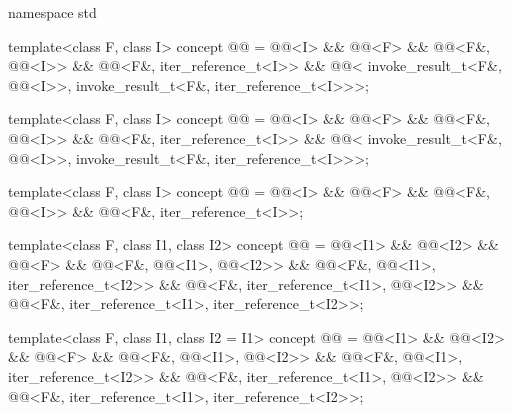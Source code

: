 \begin{codeblock}
namespace std {
  template<class F, class I>
    concept @@ =
      @@<I> &&
      @@<F> &&
      @@<F&, @@<I>> &&
      @@<F&, iter_reference_t<I>> &&
      @@<
        invoke_result_t<F&, @@<I>>,
        invoke_result_t<F&, iter_reference_t<I>>>;

  template<class F, class I>
    concept @@ =
      @@<I> &&
      @@<F> &&
      @@<F&, @@<I>> &&
      @@<F&, iter_reference_t<I>> &&
      @@<
        invoke_result_t<F&, @@<I>>,
        invoke_result_t<F&, iter_reference_t<I>>>;

  template<class F, class I>
    concept @@ =
      @@<I> &&
      @@<F> &&
      @@<F&, @@<I>> &&
      @@<F&, iter_reference_t<I>>;

  template<class F, class I1, class I2>
    concept @@ =
      @@<I1> && @@<I2> &&
      @@<F> &&
      @@<F&, @@<I1>, @@<I2>> &&
      @@<F&, @@<I1>, iter_reference_t<I2>> &&
      @@<F&, iter_reference_t<I1>, @@<I2>> &&
      @@<F&, iter_reference_t<I1>, iter_reference_t<I2>>;

  template<class F, class I1, class I2 = I1>
    concept @@ =
      @@<I1> && @@<I2> &&
      @@<F> &&
      @@<F&, @@<I1>, @@<I2>> &&
      @@<F&, @@<I1>, iter_reference_t<I2>> &&
      @@<F&, iter_reference_t<I1>, @@<I2>> &&
      @@<F&, iter_reference_t<I1>, iter_reference_t<I2>>;

}
\end{codeblock}

